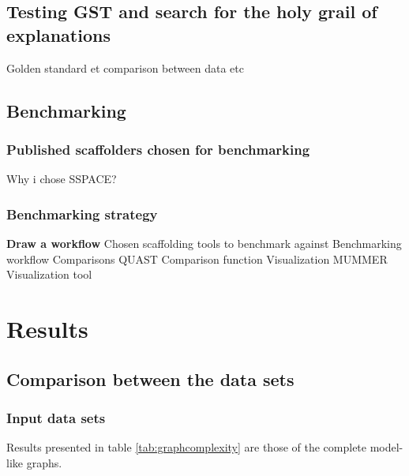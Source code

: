 \documentclass[12pt, twocolumn]{article}
\begin{document}
\subsection{Testing GST and search for the holy grail of explanations}
Golden standard et comparison between data etc


\subsection{Benchmarking} \label{sec:benchmarking}
\subsubsection{Published scaffolders chosen for benchmarking}
Why i chose SSPACE?
\subsubsection{Benchmarking strategy}
\textbf{Draw a workflow}
Chosen scaffolding tools to benchmark against
Benchmarking workflow
Comparisons
QUAST
Comparison function
Visualization
MUMMER
Visualization tool
\newpage
\section{Results}
\subsection{Comparison between the data sets}
\subsubsection{Input data sets}
Results presented in table \ref{tab:graphcomplexity} are those of the complete model-like graphs. 
\end{document}
